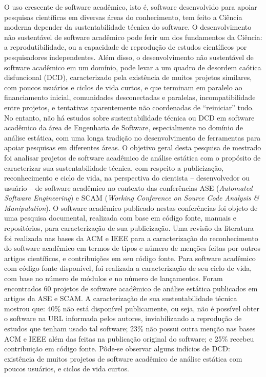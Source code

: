 O uso crescente de software acadêmico, isto é, software desenvolvido para
apoiar pesquisas científicas em diversas áreas do conhecimento, tem feito
a Ciência moderna depender da sustentabilidade técnica do software.
%
O desenvolvimento não sustentável de software acadêmico pode ferir um dos
fundamentos da Ciência: a reprodutibilidade, ou a capacidade de reprodução de
estudos científicos por pesquisadores independentes.
%
Além disso, o desenvolvimento não sustentável de software acadêmico em um
domínio, pode levar a um quadro de desordem caótica disfuncional (DCD),
caracterizado pela existência de muitos projetos similares, com poucos usuários
e ciclos de vida curtos, e que terminam em paralelo ao financiamento inicial,
comunidades desconectadas e paralelas, incompatibilidade entre projetos, e
tentativas aparentemente não coordenadas de ``reiniciar'' tudo.
%
No entanto, não há
estudos sobre sustentabilidade técnica ou DCD em software acadêmico da
área de Engenharia de Software, especialmente no domínio de análise estática,
com uma longa tradição no desenvolvimento de ferramentas para apoiar pesquisas
em diferentes áreas.
%
O objetivo geral desta pesquisa de mestrado foi analisar projetos de
software acadêmico de análise estática 
com o propósito de caracterizar sua sustentabilidade técnica, 
com respeito a publicização, reconhecimento e ciclo de vida, 
na perspectiva do cientista -- desenvolvedor ou usuário -- de software
acadêmico no contexto das conferências 
ASE ({\it Automated Software Engineering}) e SCAM ({\it Working Conference on Source Code
Analysis \& Manipulation}).
%
O software acadêmico publicado nestas conferências 
foi objeto de uma pesquisa documental, realizada com base em código fonte, 
manuais e repositórios, para caracterização de sua publicização.
%
Uma revisão da literatura foi realizada nas bases da ACM e IEEE
para a caracterização do reconhecimento do software acadêmico
em termos de tipos e número de menções feitas por outros artigos científicos, e
contribuições em seu código fonte.
%
Para software acadêmico com código fonte disponível, 
foi realizada a caracterização de seu ciclo de vida,
com base no número de módulos e no número de lançamentos.
%
Foram encontrados 60 projetos de software acadêmico de análise estática
publicados em artigos da ASE e SCAM.
%
A caracterização de sua sustentabilidade técnica mostrou que: 
40\% não está disponível publicamente, ou seja, não é possível obter 
o software na URL informada pelos autores, inviabilizando 
a reprodução de estudos que tenham usado tal software;
%
23\% não possui outra menção nas bases ACM e IEEE além das feitas na publicação original
do software; e 25\% recebeu contribuição em código fonte.
%
Pôde-se observar alguns indícios de DCD: 
existência de muitos projetos de software acadêmico de análise estática
com poucos usuários, e ciclos de vida curtos.
